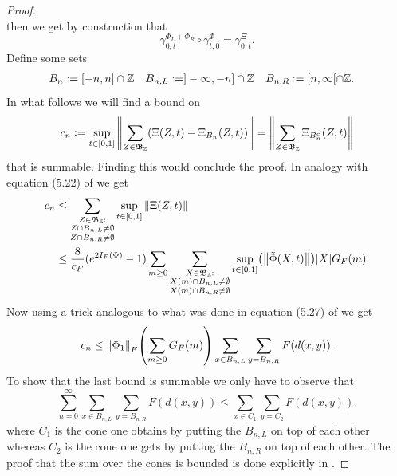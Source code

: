 \documentclass[12pt,a4paper,twoside]{article}
\newcommand{\defeq}{\vcentcolon=}
\let\originalleft\left
\let\originalright\right
\renewcommand{\left}{\mathopen{}\mathclose\bgroup\originalleft}
\renewcommand{\right}{\aftergroup\egroup\originalright}
\newcommand{\ZZ}{\mathbb Z}
\theoremstyle{definition}
\numberwithin{equation}{section}
\begin{document}
\begin{proof}
\begin{equation}
	\end{equation}
	then we get by construction that
	\begin{equation}
		\gamma^{\Phi_L+\Phi_R}_{0;t}\circ\gamma^{\Phi}_{t;0}=\gamma^{\Xi}_{0;t}.
	\end{equation}
	Define some sets
	\begin{align}
		B_n&\defeq [-n,n]\cap\ZZ&B_{n,L}&\defeq ]-\infty,-n]\cap\ZZ&B_{n,R}&\defeq[n,\infty[\cap\ZZ.
	\end{align}
	In what follows we will find a bound on
	\begin{equation}
		c_n\defeq \sup_{t\in[0,1]}\norm{\sum_{Z\in\mathfrak{B}_\ZZ}(\Xi(Z,t)-\Xi_{B_n}(Z,t))}=\norm{\sum_{Z\in\mathfrak{B}_\ZZ}\Xi_{B_n^c}(Z,t)}
	\end{equation}
	that is summable. Finding this would conclude the proof. In analogy with equation (5.22) of \cite{ogata2021h3gmathbb} we get
	\begin{align}
		c_n&\leq \sum_{\substack{Z\in\mathfrak{B}_{\ZZ}:\\Z\cap B_{n,L}\neq\emptyset\\Z\cap B_{n,R}\neq\emptyset}}\sup_{t\in[0,1]}\norm{\Xi(Z,t)}\\
		&\leq \frac{8}{c_F}(e^{2I_F(\Phi)}-1) \sum_{m\geq 0}\sum_{\substack{X\in\mathfrak{B}_{\ZZ}:\\X(m)\cap B_{n,L}\neq\emptyset\\X(m)\cap B_{n,R}\neq\emptyset}}\sup_{t\in[0,1]}\left(\norm{\tilde{\Phi}(X,t)}\right)\abs{X}G_F(m).
	\end{align}
	Now using a trick analogous to what was done in equation (5.27) of \cite{ogata2021h3gmathbb} we get
	\begin{equation}
		c_n\leq \norm{\Phi_1}_F\left(\sum_{m\geq 0}G_F(m)\right)\sum_{x\in B_{n,L}}\sum_{y=B_{n,R}}F(d(x,y)).
	\end{equation}
	To show that the last bound is summable we only have to observe that
	\begin{equation}
		\sum_{n=0}^\infty\sum_{x\in B_{n,L}}\sum_{y=B_{n,R}}F(d(x,y))\leq \sum_{x\in C_1}\sum_{y=C_2}F(d(x,y)).
	\end{equation}
	where $C_1$ is the cone one obtains by putting the $B_{n,L}$ on top of each other whereas $C_2$ is the cone one gets by putting the $B_{n,R}$ on top of each other. The proof that the sum over the cones is bounded is done explicitly in \cite{ogata2021h3gmathbb}.
\end{proof}
\end{document}
